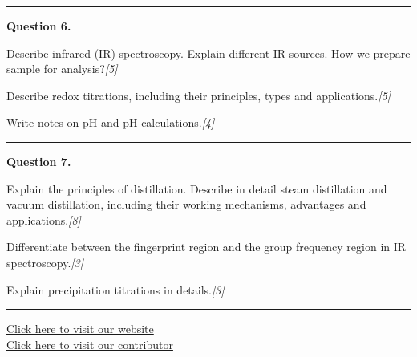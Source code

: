 \documentclass[11pt,a4paper]{article}
\newcommand{\pts}[1]{\hfill   \textit{[#1]}}
\begin{document}
\medskip\rule{\linewidth}{0.2pt}\medskip




\noindent   \textbf{Question 6.}

\begin{parts}
  \item Describe infrared (IR) spectroscopy. Explain different IR sources. How we prepare sample for analysis?\pts{5}
  \item Describe redox titrations, including their principles, types and applications.\pts{5}
  \item Write notes on pH and pH calculations.\pts{4}
\end{parts}

\medskip\rule{\linewidth}{0.2pt}\medskip




\noindent   \textbf{Question 7.}

\begin{parts}
  \item Explain the principles of distillation. Describe in detail steam distillation and vacuum distillation, including their working mechanisms, advantages and applications.\pts{8}
  \item Differentiate between the fingerprint region and the group frequency region in IR spectroscopy.\pts{3}
  \item Explain precipitation titrations in details.\pts{3}
\end{parts}

\vfill
\rule{\linewidth}{0.4pt}

\begin{center}\small
\href{https://bhu-exam.vercel.app/}{Click here to visit our website}\\[4pt]
\href{https://me-aryan.vercel.app/}{Click here to visit our contributor}
\end{center}
\end{document}
